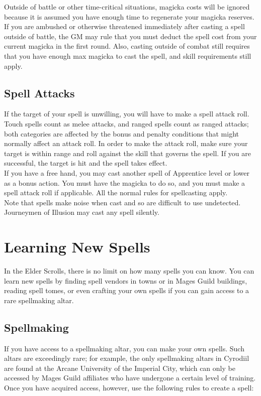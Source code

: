 Outside of battle or other time-critical situations, magicka costs will be ignored because it is assumed you have enough time to regenerate your magicka reserves. If you are ambushed or otherwise threatened immediately after casting a spell outside of battle, the GM may rule that you must deduct the spell cost from your current magicka in the first round. Also, casting outside of combat still requires that you have enough max magicka to cast the spell, and skill requirements still apply.

\subsection{Spell Attacks}
If the target of your spell is unwilling, you will have to make a spell attack roll. Touch spells count as melee attacks, and ranged spells count as ranged attacks; both categories are affected by the bonus and penalty conditions that might normally affect an attack roll. In order to make the attack roll, make sure your target is within range and roll against the skill that governs the spell. If you are successful, the target is hit and the spell takes effect.\\

If you have a free hand, you may cast another spell of Apprentice level or lower as a bonus action. You must have the magicka to do so, and you must make a spell attack roll if applicable. All the normal rules for spellcasting apply.\\

Note that spells make noise when cast and so are difficult to use undetected. Journeymen of Illusion may cast any spell silently.



\section{Learning New Spells}

In the Elder Scrolls, there is no limit on how many spells you can know. You can learn new spells by finding spell vendors in towns or in Mages Guild buildings, reading spell tomes, or even crafting your own spells if you can gain access to a rare spellmaking altar.

\subsection{Spellmaking}
If you have access to a spellmaking altar, you can make your own spells. Such altars are exceedingly rare; for example, the only spellmaking altars in Cyrodiil are found at the Arcane University of the Imperial City, which can only be accessed by Mages Guild affiliates who have undergone a certain level of training. Once you have acquired access, however, use the following rules to create a spell:

